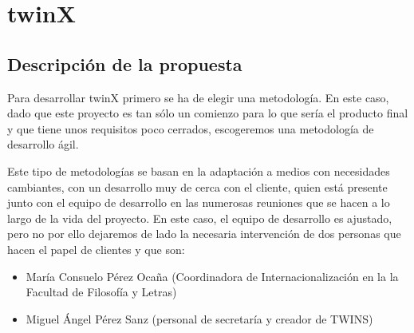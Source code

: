 \section{twinX}
\subsection{Descripción de la propuesta}

Para desarrollar twinX primero se ha de elegir una metodología. En este caso, dado que este proyecto es tan sólo un comienzo para lo que sería el producto final y que tiene unos requisitos poco cerrados, escogeremos una metodología de desarrollo ágil.

Este tipo de metodologías se basan en la adaptación a medios con necesidades cambiantes, con un desarrollo muy de cerca con el cliente, quien está presente junto con el equipo de desarrollo en las numerosas reuniones que se hacen a lo largo de la vida del proyecto. En este caso, el equipo de desarrollo es ajustado, pero no por ello dejaremos de lado la necesaria intervención de dos personas que hacen el papel de clientes y que son:

\begin{itemize}
	\item María Consuelo Pérez Ocaña (Coordinadora de Internacionalización en la la Facultad de Filosofía y Letras)
	\item Miguel Ángel Pérez Sanz (personal de secretaría y creador de TWINS)
\end{itemize}